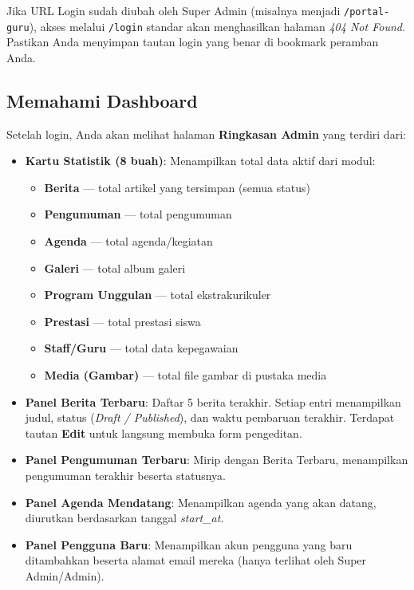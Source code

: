 \begin{notebox}
  Jika URL Login sudah diubah oleh Super Admin (misalnya menjadi \texttt{/portal-guru}),
  akses melalui \texttt{/login} standar akan menghasilkan halaman \textit{404 Not Found}.
  Pastikan Anda menyimpan tautan login yang benar di bookmark peramban Anda.
\end{notebox}

\subsection{Memahami Dashboard}

Setelah login, Anda akan melihat halaman \textbf{Ringkasan Admin} yang terdiri dari:

\begin{itemize}
  \item \textbf{Kartu Statistik (8 buah)}: Menampilkan total data aktif dari modul:
        \begin{itemize}
          \item \textbf{Berita} --- total artikel yang tersimpan (semua status)
          \item \textbf{Pengumuman} --- total pengumuman
          \item \textbf{Agenda} --- total agenda/kegiatan
          \item \textbf{Galeri} --- total album galeri
          \item \textbf{Program Unggulan} --- total ekstrakurikuler
          \item \textbf{Prestasi} --- total prestasi siswa
          \item \textbf{Staff/Guru} --- total data kepegawaian
          \item \textbf{Media (Gambar)} --- total file gambar di pustaka media
        \end{itemize}
  \item \textbf{Panel Berita Terbaru}: Daftar 5 berita terakhir. Setiap entri menampilkan
        judul, status (\textit{Draft / Published}), dan waktu pembaruan terakhir.
        Terdapat tautan \textbf{Edit} untuk langsung membuka form pengeditan.
  \item \textbf{Panel Pengumuman Terbaru}: Mirip dengan Berita Terbaru, menampilkan
        pengumuman terakhir beserta statusnya.
  \item \textbf{Panel Agenda Mendatang}: Menampilkan agenda yang akan datang,
        diurutkan berdasarkan tanggal \textit{start\_at}.
  \item \textbf{Panel Pengguna Baru}: Menampilkan akun pengguna yang baru ditambahkan
        beserta alamat email mereka (hanya terlihat oleh Super Admin/Admin).
\end{itemize}

